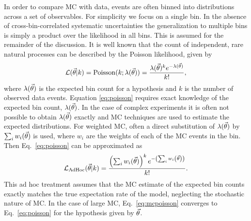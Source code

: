 In order to compare MC with data, events are often binned into distributions across a set of observables.
For simplicity we focus on a single bin.
In the absence of cross-bin-correlated systematic uncertainties the generalization to multiple bins is simply a product over the likelihood in all bins.
This is assumed for the remainder of the discussion.
It is well known that the count of independent, rare natural processes can be described by the Poisson likelihood, given by
\begin{equation}
\label{eq:poisson}
\mathcal{L}(\vec{\theta}|k) = \mathrm{Poisson}(k;\lambda(\vec{\theta})) = \frac{\lambda(\vec{\theta})^{k}e^{-\lambda(\vec{\theta})}}{k!},
\end{equation}
where $\lambda(\vec{\theta})$ is the expected bin count for a hypothesis and $k$ is the number of observed data events.
Equation \eqref{eq:poisson} requires exact knowledge of the expected bin count, $\lambda(\vec{\theta})$.
In the case of complex experiments it is often not possible to obtain $\lambda(\vec{\theta})$ exactly and MC techniques are used to estimate the expected distributions.
For weighted MC, often a direct substitution of $\lambda(\vec{\theta})$ by $\sum_i{w_i(\vec{\theta})}$ is used, where $w_i$ are the weights of each of the MC events in the bin.
Then Eq.~\eqref{eq:poisson} can be approximated as
\begin{equation} \label{eq:mcpoisson}
\mathcal{L}_{\textmd{AdHoc}}(\vec{\theta}|k) = \frac{\left(\sum_{i}{w_i(\vec{\theta})}\right)^{k}e^{-\left(\sum_{i}{w_i\left(\vec{\theta}\right)}\right)}}{k!}.
\end{equation}
This ad hoc treatment assumes that the MC estimate of the expected bin counts exactly matches the true expectation rate of the model, neglecting the stochastic nature of MC.
In the case of large MC, Eq.~\eqref{eq:mcpoisson} converges to Eq.~\eqref{eq:poisson} for the hypothesis given by $\vec{\theta}$.
